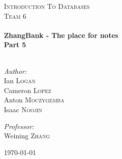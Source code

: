 \begin{titlepage}
 
\begin{center}
 
 
\textsc{\LARGE Introduction To Databases}\\[1.5cm]
 
\textsc{\Large Team 6}\\[0.5cm]
 
\HRule \\[0.4cm]
{ \huge \bfseries ZhangBank - The place for notes\\Part 5}\\[0.4cm]
 
\HRule \\[1.5cm]
 
\begin{minipage}{0.4\textwidth}
\begin{flushleft} \large
\emph{Author:}\\
Ian \textsc{Logan}\\ Cameron \textsc{Lopez}\\ Anton
\textsc{Moczygemba}\\ Isaac \textsc{Noojin}
\end{flushleft}
\end{minipage}
\begin{minipage}{0.4\textwidth}
\begin{flushright} \large
\emph{Professor:} \\
Weining \textsc{Zhang}
\end{flushright}
\end{minipage}
 
\vfill
 
{\large \today}
 
\end{center}
 
\end{titlepage}